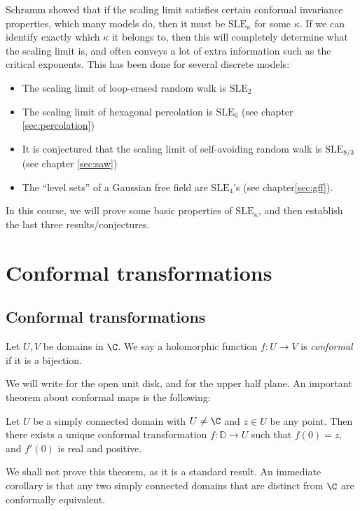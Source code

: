 \documentclass[a4paper]{article}
\renewcommand\D{\mathbb{D}}
\newcommand\SLE{\mathrm{SLE}}
\begin{document}
Schramm showed that if the scaling limit satisfies certain conformal invariance properties, which many models do, then it must be $\SLE_\kappa$ for some $\kappa$. If we can identify exactly which $\kappa$ it belongs to, then this will completely determine what the scaling limit is, and often conveys a lot of extra information such as the critical exponents. This has been done for several discrete models:
\begin{itemize}
  \item The scaling limit of loop-erased random walk is $\SLE_2$
  \item The scaling limit of hexagonal percolation is $\SLE_6$ (see chapter \ref{sec:percolation})
  \item It is conjectured that the scaling limit of self-avoiding random walk is $\SLE_{8/3}$ (see chapter \ref{sec:saw})
  \item The ``level sets'' of a Gaussian free field are $\SLE_4$'s (see chapter\ref{sec:gff}).
\end{itemize}
In this course, we will prove some basic properties of $\SLE_\kappa$, and then establish the last three results/conjectures.

\section{Conformal transformations}
\subsection{Conformal transformations}
\begin{defi}
  Let $U, V$ be domains in $\C$. We say a holomorphic function $f: U \to V$ is \emph{conformal} if it is a bijection.
\end{defi}

We will write \term{$\D$} for the open unit disk, and \term{$\H$} for the upper half plane. An important theorem about conformal maps is the following:
\begin{thm}
  Let $U$ be a simply connected domain with $U \not= \C$ and $z \in U$ be any point. Then there exists a unique conformal transformation $f: \D \to U$ such that $f(0) = z$, and $f'(0)$ is real and positive.
\end{thm}
We shall not prove this theorem, as it is a standard result. An immediate corollary is that any two simply connected domains that are distinct from $\C$ are conformally equivalent.
\end{document}
